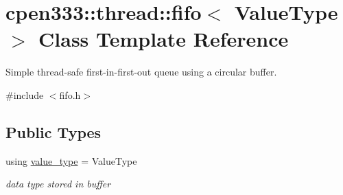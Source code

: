 \hypertarget{classcpen333_1_1thread_1_1fifo}{}\section{cpen333\+:\+:thread\+:\+:fifo$<$ Value\+Type $>$ Class Template Reference}
\label{classcpen333_1_1thread_1_1fifo}


Simple thread-\/safe first-\/in-\/first-\/out queue using a circular buffer.  




{\ttfamily \#include $<$fifo.\+h$>$}

\subsection*{Public Types}
\begin{DoxyCompactItemize}
\item 
\mbox{\label{classcpen333_1_1thread_1_1fifo_ac73f246cbe0a1361e1405c5899634cee}} 
using \hyperlink{classcpen333_1_1thread_1_1fifo_ac73f246cbe0a1361e1405c5899634cee}{value\+\_\+type} = Value\+Type
\begin{DoxyCompactList}\small\item\em data type stored in buffer \end{DoxyCompactList}\end{DoxyCompactItemize}
